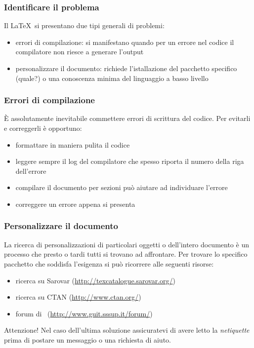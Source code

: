 \documentclass[svgnames,%
	ucs,%
	pdftex]{guitbeamer}
\begin{document}
\begin{frame}
  \frametitle{Identificare il problema}
	Il \LaTeX\ si presentano due tipi generali di problemi:
	\begin{itemize}
	\item errori di compilazione: si manifestano quando per un errore nel codice il compilatore non riesce a generare l'output
	\item personalizzare il documento: richiede l'istallazione del pacchetto specifico (quale?) o una conoscenza minima del linguaggio a basso livello 
	\end{itemize}
\end{frame}
\begin{frame}
  \frametitle{Errori di compilazione} 
	\`E assolutamente inevitabile commettere errori di scrittura del codice. Per evitarli e  correggerli \`e opportuno:
	\begin{itemize}
		\item formattare in maniera pulita il codice
		\item leggere sempre il log del compilatore che spesso riporta il numero della riga dell'errore
		\item compilare il documento per sezioni pu\`o aiutare ad individuare l'errore
		\item correggere un errore appena si presenta
	\end{itemize}
\end{frame}
\begin{frame}
  \frametitle{Personalizzare il documento}
	La ricerca di personalizzazioni di particolari oggetti o dell'intero documento \`e un processo che presto o tardi tutti si trovano ad affrontare. Per trovare lo specifico pacchetto che soddisfa l'esigenza si pu\`o ricorrere alle seguenti risorse:
	\begin{itemize}
	\item ricerca su Sarovar (\url{http://texcatalogue.sarovar.org/})
	\item ricerca su CTAN (\url{http://www.ctan.org/})
	\item forum di \GuIT\  (\url{http://www.guit.sssup.it/forum/})
	\end{itemize}
	\begin{block}{Attenzione!}
		Nel caso dell'ultima soluzione assicuratevi di avere letto la \textit{netiquette} prima di postare un messaggio o una richiesta di aiuto.
	\end{block}
\end{frame}
\end{document}
